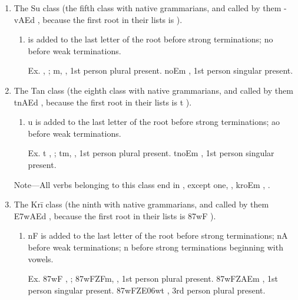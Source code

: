 \begin{enumerate}
\item The Su class (the fifth class with native grammarians, and called
  by them {\dn -vAEd} , because the first root in their lists is
  {\dn {}} ).

  \begin{enumerate}
  \item {\dn {}}  is added to the last letter of the root before
    strong terminations; {\dn no}  before weak terminations.

    Ex. {\dn {}} , ; {\dn {}m,} , 1st
    person plural present. {\dn {}noEm} , 1st person singular
    present.
  \end{enumerate}

\item The Tan class (the eighth class with native grammarians, and
  called by them {\dn tnAEd} , because the first root in their
  lists is {\dn t} ).

  \begin{enumerate}
  \item {\dn u}  is added to the last letter of the root before
    strong terminations; {\dn ao}  before weak terminations.

    Ex. {\dn t} , ; {\dn tm,} ,
    1st person plural present. {\dn tnoEm} , 1st person
    singular present.
  \end{enumerate}

  \begin{note}
    Note—All verbs belonging to this class end in {\dn {}} , except
    one, {\dn {}} , {\dn kroEm} , .
  \end{note}

\item The Krī class (the ninth with native grammarians, and called by
  them {\dn \3E7wAEd} , because the first root in their lists is
  {\dn \387wF} ).

  \begin{enumerate}
  \item {\dn nF}  is added to the last letter of the root before
    strong terminations; {\dn nA}  before weak terminations; {\dn n}
     before strong terminations beginning with vowels.

    Ex. {\dn \387wF} , ; {\dn \387wFZFm,} ,
    1st person plural present. {\dn \387wFZAEm} , 1st person
    singular present. {\dn \387wFZE\306wt} , 3rd person plural
    present.
  \end{enumerate}
\end{enumerate}

